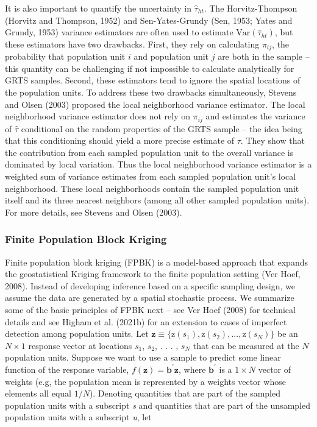 \documentclass[]{elsarticle} %
\begin{document}
It is also important to quantify the uncertainty in \(\hat{\tau}_{ht}\).
The Horvitz-Thompson (Horvitz and Thompson, 1952) and Sen-Yates-Grundy
(Sen, 1953; Yates and Grundy, 1953) variance estimators are often used
to estimate \(\text{Var}(\hat{\tau}_{ht})\), but these estimators have
two drawbacks. First, they rely on calculating \(\pi_{ij}\), the
probability that population unit \(i\) and population unit \(j\) are
both in the sample -- this quantity can be challenging if not impossible
to calculate analytically for GRTS samples. Second, these estimators
tend to ignore the spatial locations of the population units. To address
these two drawbacks simultaneously, Stevens and Olsen (2003) proposed
the local neighborhood variance estimator. The local neighborhood
variance estimator does not rely on \(\pi_{ij}\) and estimates the
variance of \(\hat{\tau}\) conditional on the random properties of the
GRTS sample -- the idea being that this conditioning should yield a more
precise estimate of \(\tau\). They show that the contribution from each
sampled population unit to the overall variance is dominated by local
variation. Thus the local neighborhood variance estimator is a weighted
sum of variance estimates from each sampled population unit's local
neighborhood. These local neighborhoods contain the sampled population
unit itself and its three nearest neighbors (among all other sampled
population units). For more details, see Stevens and Olsen (2003).

\hypertarget{finite-population-block-kriging}{%
\subsubsection{Finite Population Block
Kriging}\label{finite-population-block-kriging}}

Finite population block kriging (FPBK) is a model-based approach that
expands the geostatistical Kriging framework to the finite population
setting (Ver Hoef, 2008). Instead of developing inference based on a
specific sampling design, we assume the data are generated by a spatial
stochastic process. We summarize some of the basic principles of FPBK
next -- see Ver Hoef (2008) for technical details and see Higham et al.
(2021b) for an extension to cases of imperfect detection among
population units. Let
\({\mathbf{z} \equiv \{\text{z}(s_1), \text{z}(s_2), . . . , \text{z}(s_N) \}}\)
be an \(N \times 1\) response vector at locations \(s_1\), \(s_2\), . .
. , \(s_N\) that can be measured at the \(N\) population units. Suppose
we want to use a sample to predict some linear function of the response
variable, \(f(\mathbf{z}) = \mathbf{b}^\prime \mathbf{z}\), where
\(\mathbf{b}^\prime\) is a \(1 \times N\) vector of weights (e.g, the
population mean is represented by a weights vector whose elements all
equal \(1 / N\)). Denoting quantities that are part of the sampled
population units with a subscript \emph{s} and quantities that are part
of the unsampled population units with a subscript \emph{u}, let
\end{document}
